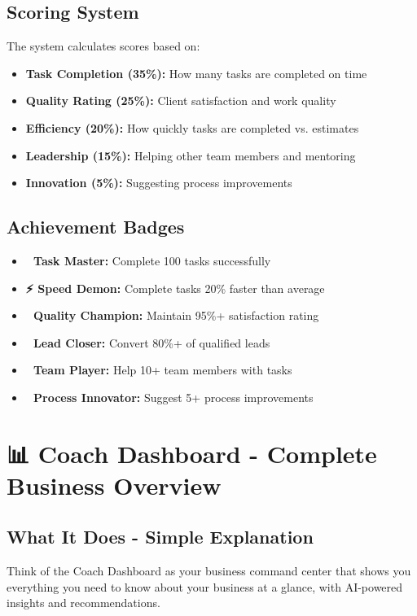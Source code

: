 \documentclass[12pt,a4paper]{article}
\begin{document}
\subsection{Scoring System}
The system calculates scores based on:
\begin{itemize}
    \item \textbf{Task Completion (35\%):} How many tasks are completed on time
    \item \textbf{Quality Rating (25\%):} Client satisfaction and work quality
    \item \textbf{Efficiency (20\%):} How quickly tasks are completed vs. estimates
    \item \textbf{Leadership (15\%):} Helping other team members and mentoring
    \item \textbf{Innovation (5\%):} Suggesting process improvements
\end{itemize}

\subsection{Achievement Badges}
\begin{itemize}
    \item \textbf{🏅 Task Master:} Complete 100 tasks successfully
    \item \textbf{⚡ Speed Demon:} Complete tasks 20\% faster than average
    \item \textbf{💎 Quality Champion:} Maintain 95\%+ satisfaction rating
    \item \textbf{🎯 Lead Closer:} Convert 80\%+ of qualified leads
    \item \textbf{🌟 Team Player:} Help 10+ team members with tasks
    \item \textbf{🚀 Process Innovator:} Suggest 5+ process improvements
\end{itemize}

\section{📊 Coach Dashboard - Complete Business Overview}

\subsection{What It Does - Simple Explanation}
Think of the Coach Dashboard as your business command center that shows you everything you need to know about your business at a glance, with AI-powered insights and recommendations.
\end{document}
